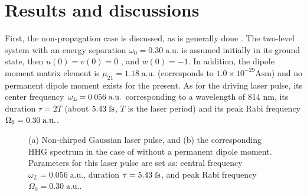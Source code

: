 \documentclass[10pt,letterpaper]{article}
\begin{document}
\section{Results and discussions}
First, the non-propagation case is discussed, as is generally done \cite{CuiNi2010NJP-wavelet,Faria-Two-Level-Three-Step-PRA-2002,Gauthey-Early-Two-Level-PRA-1997,Gong-Two-Level-Two-Color-JMO-1999,Kaplan-Early-Two-Level-PRA-1994,LiuChengpu-Two-Level-PRA-2004,YangWeifeng-Two-Level-PLA-2007,ZengZhinan-Two-Color-PRL-2007,WANG-ZHONG-YANG-Two-Level-Attosecond-generation-1999}. The two-level system with an energy separation $\omega_0=0.30\;\textrm{a.u.}$ is assumed initially in its ground state, then $ u(0)=v(0)=0 $ , and $ w(0)=-1 $. In addition, the dipole moment matrix element is $\mu_{21}=1.18\;\textrm{a.u.}$ (corresponds to $1.0\times10^{-29}\textrm{Asm}$) and no permanent dipole moment exists for the present. As for the driving laser pulse, its center frequency $ \omega_{\rm{L}}=0.056\;\rm{a.u.}$ corresponding to a wavelength of 814 nm, its duration $\tau=2T$ (about $ 5.43\;\rm{fs} $, $T$ is the laser period) and its peak Rabi frequency $ \Omega_{0}=0.30\;\rm{a.u.} $.

\begin{figure}[!htbp]
	\centering
	\caption{(a) Non-chirped Gaussian laser pulse, and (b) the corresponding HHG spectrum in the case of without a permanent dipole moment. Parameters for this laser pulse are set as: central frequency $\omega_L=0.056\;\textrm{a.u.}$, duration $\tau=5.43\;\rm{fs}$, and peak Rabi frequency $\Omega_0=0.30\;\textrm{a.u.}$.}
	\label{fig1}
\end{figure}
\end{document}
